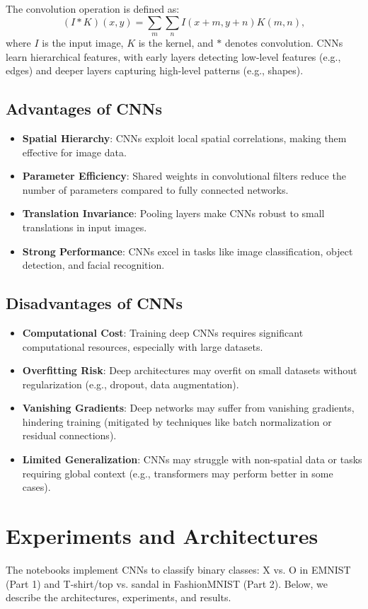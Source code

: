 \documentclass{article}
\begin{document}
The convolution operation is defined as:
\[
(I * K)(x, y) = \sum_{m} \sum_{n} I(x + m, y + n) K(m, n),
\]
where \( I \) is the input image, \( K \) is the kernel, and \( * \) denotes convolution. CNNs learn hierarchical features, with early layers detecting low-level features (e.g., edges) and deeper layers capturing high-level patterns (e.g., shapes).

\subsection{Advantages of CNNs}
\begin{itemize}
    \item \textbf{Spatial Hierarchy}: CNNs exploit local spatial correlations, making them effective for image data.
    \item \textbf{Parameter Efficiency}: Shared weights in convolutional filters reduce the number of parameters compared to fully connected networks.
    \item \textbf{Translation Invariance}: Pooling layers make CNNs robust to small translations in input images.
    \item \textbf{Strong Performance}: CNNs excel in tasks like image classification, object detection, and facial recognition.
\end{itemize}

\subsection{Disadvantages of CNNs}
\begin{itemize}
    \item \textbf{Computational Cost}: Training deep CNNs requires significant computational resources, especially with large datasets.
    \item \textbf{Overfitting Risk}: Deep architectures may overfit on small datasets without regularization (e.g., dropout, data augmentation).
    \item \textbf{Vanishing Gradients}: Deep networks may suffer from vanishing gradients, hindering training (mitigated by techniques like batch normalization or residual connections).
    \item \textbf{Limited Generalization}: CNNs may struggle with non-spatial data or tasks requiring global context (e.g., transformers may perform better in some cases).
\end{itemize}

\section{Experiments and Architectures}
The notebooks implement CNNs to classify binary classes: X vs. O in EMNIST (Part 1) and T-shirt/top vs. sandal in FashionMNIST (Part 2). Below, we describe the architectures, experiments, and results.
\end{document}
